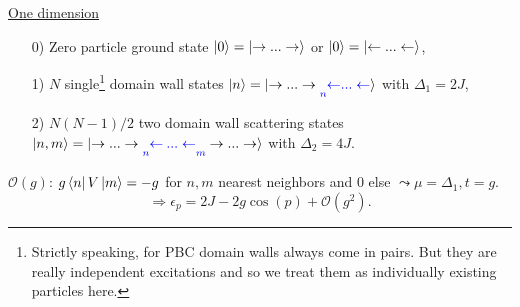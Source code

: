 \noindent \underline{One dimension}
\begin{enumerate}
	\item[0)] Zero particle ground state $\ket{0} = \ket{\rightarrow ... \rightarrow}$ or $\ket{0} = \ket{\leftarrow ... \leftarrow}$,
	\item[1)] $N$ single\footnote{Strictly speaking, for PBC domain walls always come in pairs. But they are really independent excitations and so we treat them as individually existing particles here.} domain wall states $\ket{n} =  \ket{\rightarrow ... \rightarrow \underset{\textcolor{blue}{n}}{}\textcolor{blue}{\leftarrow} \textcolor{blue}{ ... \leftarrow}}$ with $\Delta_1 = 2J$,
	\item[2)] $N(N-1)/2$ two domain wall scattering states $\ket{n, m} = \ket{\rightarrow ... \rightarrow \underset{\textcolor{blue}{n}}{} \textcolor{blue} {\leftarrow}\: \textcolor{blue}{ ... \leftarrow} \underset{\textcolor{blue}{m}}{} \rightarrow ... \rightarrow}$ with $\Delta_2 = 4J$.
\end{enumerate}
\noindent $\mathcal{O}(g)$: $g \bra{n} V \ket{m} = -g$ for $n, m$ nearest neighbors and $0$ else $\leadsto \mu = \Delta_1, t = g$. \\
\begin{equation} \label{eq:dispersion_small_g}
	\Rightarrow \epsilon_p = 2J - 2g \cos(p) + \mathcal{O}(g^2).
\end{equation}


